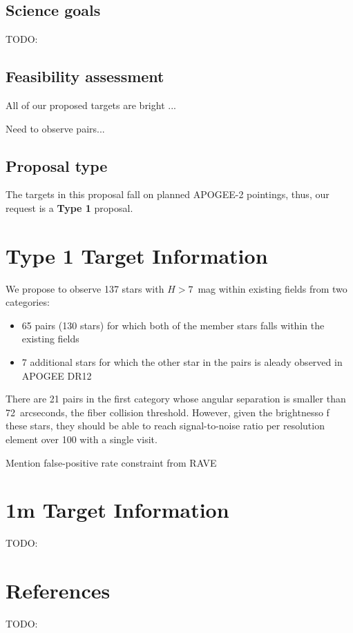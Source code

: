 \documentclass[11pt]{article}
\begin{document}
\subsection{Science goals}

TODO:

\subsection{Feasibility assessment}

All of our proposed targets are bright ...

Need to observe pairs...

\subsection{Proposal type}

The targets in this proposal fall on planned APOGEE-2 pointings, thus, our
request is a {\bf Type 1} proposal.

\section{Type 1 Target Information}

We propose to observe 137 stars with $H>7$~mag within existing fields
from two categories:
\begin{itemize}
  \item 65 pairs (130 stars) for which both of the member stars falls
  within the existing fields
  \item 7 additional stars for which the other star in the pairs is aleady
  observed in APOGEE DR12
\end{itemize}
%
There are 21 pairs in the first category whose angular separation is smaller
than 72~arcseconds, the fiber collision threshold. However, given the
brightnesso f these stars, they should be able to reach signal-to-noise ratio
per resolution element over 100 with a single visit.

Mention false-positive rate constraint from RAVE



\section{1m Target Information}

TODO:

\section{References}

TODO:
\end{document}
